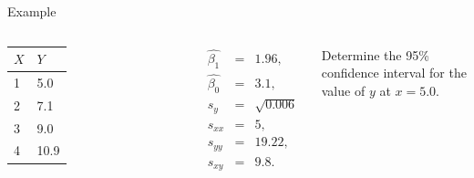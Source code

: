 \begin{frame}{Example}

    \begin{columns}

      \begin{tabular}{l|l}
        $X$ & $Y$ \\ \hline
        1 & 5.0 \\
        2 & 7.1 \\
        3 & 9.0 \\
        4 & 10.9 \\
      \end{tabular}


      \begin{eqnarray*}
        \hat{\beta_1} & = & 1.96, \\
        \hat{\beta_0} & = & 3.1, \\
        s_y & = & \sqrt{0.006} \\
        s_{xx} & = & 5, \\
        s_{yy} & = & 19.22, \\
        s_{xy} & = & 9.8. 
      \end{eqnarray*}



      Determine the 95\% confidence interval for the value of $y$ at $x=5.0$.

    \end{columns}



\end{frame}






